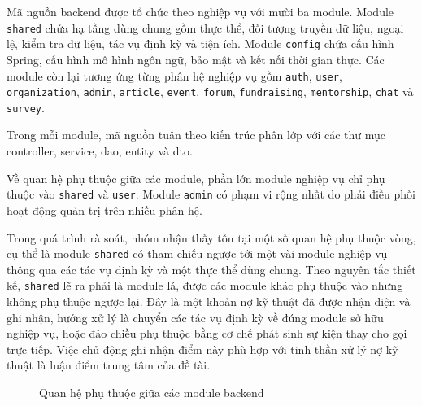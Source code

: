 \documentclass[12pt,a4paper,oneside]{report}
\begin{document}
Mã nguồn backend được tổ chức theo nghiệp vụ với mười ba module. Module \texttt{shared} chứa hạ tầng dùng chung gồm thực thể, đối tượng truyền dữ liệu, ngoại lệ, kiểm tra dữ liệu, tác vụ định kỳ và tiện ích. Module \texttt{config} chứa cấu hình Spring, cấu hình mô hình ngôn ngữ, bảo mật và kết nối thời gian thực. Các module còn lại tương ứng từng phân hệ nghiệp vụ gồm \texttt{auth}, \texttt{user}, \texttt{organization}, \texttt{admin}, \texttt{article}, \texttt{event}, \texttt{forum}, \texttt{fundraising}, \texttt{mentorship}, \texttt{chat} và \texttt{survey}.

Trong mỗi module, mã nguồn tuân theo kiến trúc phân lớp với các thư mục controller, service, dao, entity và dto.

Về quan hệ phụ thuộc giữa các module, phần lớn module nghiệp vụ chỉ phụ thuộc vào \texttt{shared} và \texttt{user}. Module \texttt{admin} có phạm vi rộng nhất do phải điều phối hoạt động quản trị trên nhiều phân hệ.

Trong quá trình rà soát, nhóm nhận thấy tồn tại một số quan hệ phụ thuộc vòng, cụ thể là module \texttt{shared} có tham chiếu ngược tới một vài module nghiệp vụ thông qua các tác vụ định kỳ và một thực thể dùng chung. Theo nguyên tắc thiết kế, \texttt{shared} lẽ ra phải là module lá, được các module khác phụ thuộc vào nhưng không phụ thuộc ngược lại. Đây là một khoản nợ kỹ thuật đã được nhận diện và ghi nhận, hướng xử lý là chuyển các tác vụ định kỳ về đúng module sở hữu nghiệp vụ, hoặc đảo chiều phụ thuộc bằng cơ chế phát sinh sự kiện thay cho gọi trực tiếp. Việc chủ động ghi nhận điểm này phù hợp với tinh thần xử lý nợ kỹ thuật là luận điểm trung tâm của đề tài.

\begin{figure}[H]\centering
{}
\caption{Quan hệ phụ thuộc giữa các module backend}
\label{fig:moduledeps}
\end{figure}
\end{document}
